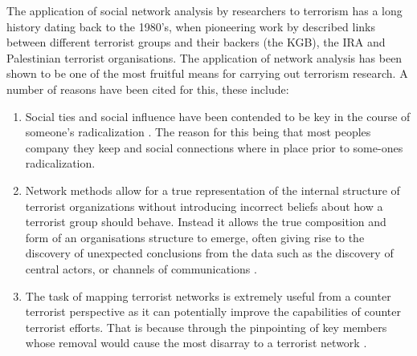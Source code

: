 The application of social network analysis by researchers to terrorism has a long history dating back to the 1980's, when pioneering work by \citep{sterling1981terror} described links between different terrorist groups and their backers (the KGB), the IRA and Palestinian terrorist organisations. The application of network analysis has been shown to be one of the most fruitful means for carrying out terrorism research. A number of reasons have been cited for this, these include:
\begin{enumerate}
\item Social ties and social influence have been contended to be key in the course of someone's radicalization \citep{hegghammer2006terrorist}. The reason for this being that most peoples company they keep and social connections where in place prior to some-ones radicalization.
\item Network methods allow for a true representation of the internal structure of terrorist organizations without introducing incorrect beliefs about how a terrorist group should behave. Instead it allows the true composition and form of an organisations structure to emerge, often giving rise to the discovery of unexpected conclusions from the data such as the discovery of central actors, or channels of communications \citep{morselli2009inside}.
\item  The task of mapping terrorist networks is extremely useful from a counter terrorist perspective as it can potentially improve the capabilities of counter terrorist efforts. That is because through the pinpointing of key members whose removal would cause the most disarray to a terrorist network \citep{joffres2011strategies}. 
\end{enumerate}
